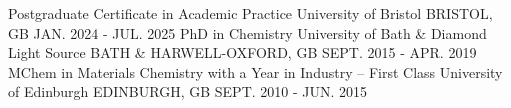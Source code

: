 \begin{cventries}
  \cventryn
    {Postgraduate Certificate in Academic Practice}
    {University of Bristol}
    {BRISTOL, GB}
    {JAN. 2024 - JUL. 2025}
  \cventryn
    {PhD in Chemistry}
    {University of Bath \& Diamond Light Source}
    {BATH \& HARWELL-OXFORD, GB}
    {SEPT. 2015 - APR. 2019}
  \cventryn
    {MChem in Materials Chemistry with a Year in Industry -- First Class}
    {University of Edinburgh}
    {EDINBURGH, GB}
    {SEPT. 2010 - JUN. 2015}
\end{cventries}
